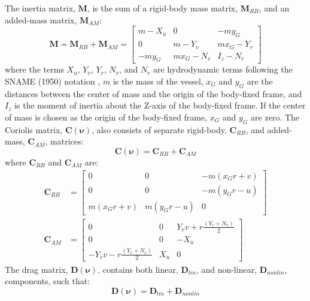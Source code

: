 \documentclass[letterpaper, 10 pt, conference]{ieeeconf}  %
\begin{document}
The inertia matrix, $\bm{M}$, is the sum of a rigid-body mass matrix, $\bm{M}_{RB}$, and an added-mass matrix, $\bm{M}_{AM}$:
%
\begin{equation}
\bm{M} = \bm{M}_{RB} + \bm{M}_{AM} =
\left[
\begin{matrix}
m-X_{\dot{u}} & 0 & -my_G\\
0 & m-Y_{\dot{v}} & mx_G - Y_{\dot{r}}\\
-my_G & mx_G - N_{\dot{v}} & I_z - N_{\dot{r}}
\end{matrix}
\right]
\end{equation}
%
where the terms $X_{\dot{u}}$, $Y_{\dot{v}}$, $Y_{\dot{r}}$, $N_{\dot{v}}$, and $N_{\dot{r}}$ are hydrodynamic terms following the SNAME (1950) notation \cite{SNAME:50a}, $m$ is the mass of the vessel, $x_G$ and $y_G$ are the distances between the center of mass and the origin of the body-fixed frame, and $I_z$ is the moment of inertia about the Z-axis of the body-fixed frame. If the center of mass is chosen as the origin of the body-fixed frame, $x_G$ and $y_G$ are zero. The Coriolis matrix, $\bm{C}\left(\bm{\nu}\right)$, also consists of separate rigid-body, $\bm{C}_{RB}$, and added-mass, $\bm{C}_{AM}$, matrices:
%
\begin{equation}
\bm{C}\left(\bm{\nu}\right) = \bm{C}_{RB} + \bm{C}_{AM}
\end{equation}
%
where $\bm{C}_{RB}$ and $\bm{C}_{AM}$ are:
%
\begin{align}
\bm{C}_{RB} &=
\left[
\begin{matrix}
0 & 0 & -m\left(x_Gr + v\right)\\
0 & 0 & -m\left(y_Gr - u\right)\\
m\left(x_Gr + v\right) & m\left(y_Gr - u\right) & 0
\end{matrix}
\right]\\
%
\bm{C}_{AM} &=
\left[
\begin{matrix}
0 & 0 & Y_{\dot{v}}v + r\frac{\left(Y_{\dot{r}} + N_{\dot{v}}\right)}{2}\\
0 & 0 & -X_{\dot{u}}\\
-Y_{\dot{v}}v - r\frac{\left(Y_{\dot{r}} + N_{\dot{v}}\right)}{2} & X_{\dot{u}} & 0
\end{matrix}
\right]
\end{align}
%
The drag matrix, $\bm{D}\left(\bm{\nu}\right)$, contains both linear, $\bm{D}_{lin}$, and non-linear, $\bm{D}_{nonlin}$, components, such that:
%
\begin{equation}
\bm{D}\left(\bm{\nu}\right) = \bm{D}_{lin} + \bm{D}_{nonlin}
\end{equation}
\end{document}
